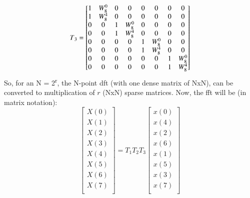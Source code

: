 \documentclass[journal,12pt,twocolumn]{IEEEtran}
\renewcommand\thesection{\arabic{section}}
\begin{document}
\begin{enumerate}[label=\thesection.\arabic*.,ref=\thesection.\theenumi]
\begin{equation}
T\textsubscript{3}  
=
\begin{bmatrix}
1 & W^{0}_{8} & 0 & 0 & 0 & 0 & 0 & 0 \\
1 & W^{4}_{8} & 0 & 0 & 0 & 0 & 0 & 0 \\
0 & 0 & 1 & W^{0}_{8} & 0 & 0 & 0 & 0\\
0 & 0 & 1 & W^{4}_{8} & 0 & 0 & 0 & 0\\
0 & 0 & 0 & 0 & 1 & W^{0}_{8} & 0 & 0 \\
0 & 0 & 0 & 0 & 1 & W^{4}_{8} & 0 & 0 \\
0 & 0 & 0 & 0 & 0 & 0 & 1 & W^{0}_{8} \\
0 & 0 & 0 & 0 & 0 & 0 & 1 & W^{4}_{8}
\end{bmatrix}
\end{equation}
So, for an N = 2\textsuperscript{r}, the N-point dft (with one dense matrix of NxN), can be converted to multiplication of $r$ (NxN) sparse matrices.
Now, the fft will be (in matrix notation):
\begin{equation}
\begin{bmatrix}
X(0) \\ 
X(1) \\ 
X(2) \\ 
X(3) \\
X(4) \\ 
X(5) \\ 
X(6) \\ 
X(7) \\
\end{bmatrix}
= T_1T_2T_3
\begin{bmatrix}
x(0) \\ 
x(4) \\ 
x(2) \\ 
x(6) \\
x(1) \\ 
x(5) \\ 
x(3) \\ 
x(7) \\
\end{bmatrix}
\end{equation}


\end{enumerate}
\end{document}
